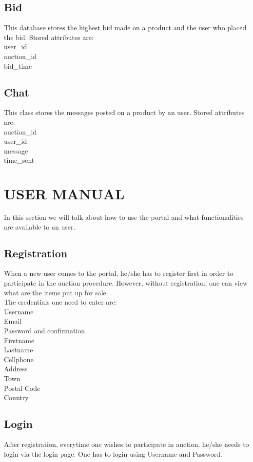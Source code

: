 \documentclass[12pt]{article}
\begin{document}
\subsection{Bid}
This database stores the highest bid made on a product and the user who placed the bid. Stored attributes are:\\
user\_id\\
	auction\_id\\
	bid\_time\\
	
\subsection{Chat}
This class stores the messages posted on a product by an user. Stored attributes are:\\
auction\_id\\
	user\_id\\
	message\\
	time\_sent\\


\section{USER MANUAL}
In this section we will talk about how to use the portal and what functionalities are available to an user.

\subsection{Registration}
When a new user comes to the portal, he/she has to register first in order to participate in the auction procedure. However, without registration, one can view what are the items put up for sale.\\
The credentials one need to enter are:\\
Username\\
Email\\
Password and confirmation\\
Firstname\\
Lastname\\
Cellphone\\
Address\\
Town\\
Postal Code\\
Country\\

\subsection{Login}
After registration, everytime one wishes to participate in auction, he/she needs to login via the login page.
One has to login using Username and Password.
\end{document}
